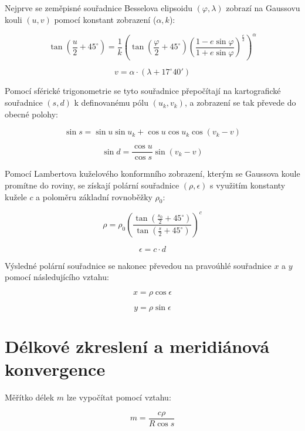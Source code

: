 \documentclass[12pt, a4paper]{article}
\begin{document}
\vspace{3mm}
\noindent Nejprve se zeměpisné souřadnice Besselova elipsoidu $(\varphi, \lambda)$ zobrazí na Gaussovu kouli $(u, v)$ pomocí konstant zobrazení ($\alpha, k$):

\[ \tan\left(\frac{u}{2} + 45^\circ\right) = \frac{1}{k} \left( \tan\left(\frac{\varphi}{2} + 45^\circ\right) \left( \frac{1 - e \sin \varphi}{1 + e \sin \varphi} \right)^{\frac{e}{2}} \right)^\alpha \]
\vspace{3mm}

\[ v = \alpha \cdot (\lambda + 17^\circ 40') \]
\vspace{3mm}

\noindent Pomocí sférické trigonometrie se tyto souřadnice přepočítají na kartografické souřadnice $(s, d)$ k definovanému pólu $(u_k, v_k)$, a zobrazení se tak převede do obecné polohy:

\[ \sin s = \sin u \sin u_k + \cos u \cos u_k \cos(v_k - v) \]
\vspace{3mm}

\[ \sin d = \frac{\cos u}{\cos s} \sin(v_k - v) \]
\vspace{3mm}

\noindent Pomocí Lambertova kuželového konformního zobrazení, kterým se Gaussova koule promítne do roviny, se získají polární souřadnice $(\rho, \epsilon)$ s využitím konstanty kužele $c$ a poloměru základní rovnoběžky $\rho_0$:

\[ \rho = \rho_0 \left( \frac{\tan(\frac{s_0}{2} + 45^\circ)}{\tan(\frac{s}{2} + 45^\circ)} \right)^c \]
\vspace{3mm}

\[ \epsilon = c \cdot d \]
\vspace{3mm}

\noindent Výsledné polární souřadnice se nakonec převedou na pravoúhlé souřadnice $x$ a $y$ pomocí následujícího vztahu:

\[ x = \rho \cos \epsilon \]
\vspace{3mm}

\[ y = \rho \sin \epsilon \]

\section*{Délkové zkreslení a meridiánová konvergence}
\vspace{5mm}
Měřítko délek $m$ lze vypočítat pomocí vztahu:

\[ m = \frac{c\rho}{R \cos s} \]
\vspace{3mm}
\end{document}

